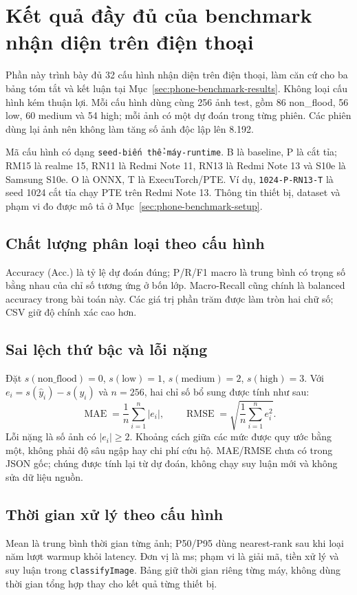 \section{Kết quả đầy đủ của benchmark nhận diện trên điện thoại}\label{sec:phone-full-results}
Phần này trình bày đủ 32 cấu hình nhận diện trên điện thoại, làm căn cứ cho ba bảng tóm tắt và kết luận tại Mục~\ref{sec:phone-benchmark-results}. Không loại cấu hình kém thuận lợi. Mỗi cấu hình dùng cùng 256 ảnh test, gồm 86 non\_flood, 56 low, 60 medium và 54 high; mỗi ảnh có một dự đoán trong từng phiên. Các phiên dùng lại ảnh nên không làm tăng số ảnh độc lập lên 8.192.

Mã cấu hình có dạng \texttt{seed-biến thể-máy-runtime}. B là baseline, P là cắt tỉa; RM15 là realme 15, RN11 là Redmi Note 11, RN13 là Redmi Note 13 và S10e là Samsung S10e. O là ONNX, T là ExecuTorch/PTE. Ví dụ, \texttt{1024-P-RN13-T} là seed 1024 cắt tỉa chạy PTE trên Redmi Note 13. Thông tin thiết bị, dataset và phạm vi đo được mô tả ở Mục~\ref{sec:phone-benchmark-setup}.

\subsection{Chất lượng phân loại theo cấu hình}
Accuracy (Acc.) là tỷ lệ dự đoán đúng; P/R/F1 macro là trung bình có trọng số bằng nhau của chỉ số tương ứng ở bốn lớp. Macro-Recall cũng chính là balanced accuracy trong bài toán này. Các giá trị phần trăm được làm tròn hai chữ số; CSV giữ độ chính xác cao hơn.


\subsection{Sai lệch thứ bậc và lỗi nặng}
Đặt $s(\mathrm{non\_flood})=0$, $s(\mathrm{low})=1$, $s(\mathrm{medium})=2$, $s(\mathrm{high})=3$. Với $e_i=s(\hat y_i)-s(y_i)$ và $n=256$, hai chỉ số bổ sung được tính như sau:
\[
\operatorname{MAE}=\frac{1}{n}\sum_{i=1}^{n}|e_i|,
\qquad
\operatorname{RMSE}=\sqrt{\frac{1}{n}\sum_{i=1}^{n}e_i^2}.
\]
Lỗi nặng là số ảnh có $|e_i|\geq2$. Khoảng cách giữa các mức được quy ước bằng một, không phải độ sâu ngập hay chi phí cứu hộ. MAE/RMSE chưa có trong JSON gốc; chúng được tính lại từ dự đoán, không chạy suy luận mới và không sửa dữ liệu nguồn.


\subsection{Thời gian xử lý theo cấu hình}
Mean là trung bình thời gian từng ảnh; P50/P95 dùng nearest-rank sau khi loại năm lượt warmup khỏi latency. Đơn vị là ms; phạm vi là giải mã, tiền xử lý và suy luận trong \texttt{classifyImage}. Bảng giữ thời gian riêng từng máy, không dùng thời gian tổng hợp thay cho kết quả từng thiết bị.



